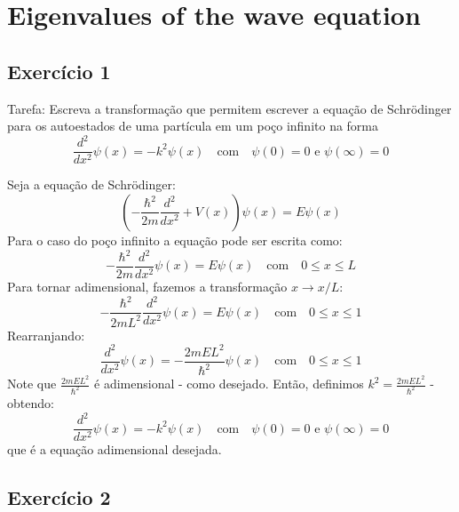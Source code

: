 \documentclass[12pt, a4paper]{article} %
\begin{document}
\section{Eigenvalues of the wave equation}

    \subsection{Exerc\'icio 1}

        Tarefa: Escreva a transforma\c{c}\~ao que permitem escrever a equa\c{c}\~ao de Schr\"odinger para os
        autoestados de uma part\'icula em um po\c{c}o infinito na forma
        \begin{equation}
            \frac{d^2}{dx^2}\psi(x) = -k^2\psi(x) \quad \text{com} \quad \psi(0) = 0 \text{ e } \psi(\infty) = 0
        \end{equation}

        Seja a equação de Schr\"odinger:
        \begin{equation}
                \left(-\frac{\hbar^2}{2m}\frac{d^2}{dx^2} + V(x)\right)\psi(x) = E\psi(x)
        \end{equation}
        Para o caso do po\c{c}o infinito a equa\c{c}\~ao pode ser escrita como:
        \begin{equation}
                -\frac{\hbar^2}{2m}\frac{d^2}{dx^2}\psi(x) = E\psi(x) \quad \text{com} \quad 0 \leq x \leq L 
        \end{equation}
        Para tornar adimensional, fazemos a transforma\c{c}\~ao $x \longrightarrow x/L$:
        \begin{equation}
                -\frac{\hbar^2}{2mL^2}\frac{d^2}{dx^2}\psi(x) = E\psi(x) \quad \text{com} \quad 0 \leq x \leq 1
        \end{equation}
        Rearranjando:
        \begin{equation}
            \frac{d^2}{dx^2}\psi(x) = -\frac{2mEL^2}{\hbar^2}\psi(x) \quad \text{com} \quad 0 \leq x \leq 1
        \end{equation}
        Note que $\frac{2mEL^2}{\hbar^2}$ \'e adimensional - como desejado. Ent\~ao, definimos $k^2 = \frac{2mEL^2}{\hbar^2}$ - obtendo:
        \begin{equation}
            \frac{d^2}{dx^2}\psi(x) = -k^2\psi(x) \quad \text{com} \quad \psi(0) = 0 \text{ e } \psi(\infty) = 0
        \end{equation}
        que \'e a equa\c{c}\~ao adimensional desejada.


    \subsection{Exerc\'icio 2}
\end{document}

